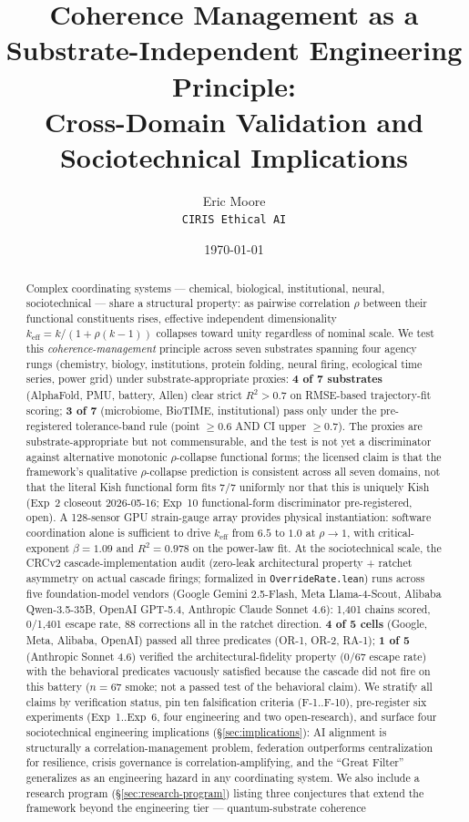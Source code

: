 \documentclass[11pt,a4paper]{article}
\title{Coherence Management as a Substrate-Independent Engineering Principle:\\
\large Cross-Domain Validation and Sociotechnical Implications}
\author{Eric Moore \\ \texttt{CIRIS Ethical AI}}
\date{\today}
\begin{document}
\maketitle

\begin{abstract}
Complex coordinating systems --- chemical, biological, institutional, neural, sociotechnical --- share a structural property: as pairwise correlation $\rho$ between their functional constituents rises, effective independent dimensionality $k_{\text{eff}} = k / (1 + \rho(k-1))$ collapses toward unity regardless of nominal scale. We test this \emph{coherence-management} principle across seven substrates spanning four agency rungs (chemistry, biology, institutions, protein folding, neural firing, ecological time series, power grid) under substrate-appropriate proxies: \textbf{4 of 7 substrates} (AlphaFold, PMU, battery, Allen) clear strict $R^2 > 0.7$ on RMSE-based trajectory-fit scoring; \textbf{3 of 7} (microbiome, BioTIME, institutional) pass only under the pre-registered tolerance-band rule (point $\geq 0.6$ AND CI upper $\geq 0.7$). The proxies are substrate-appropriate but not commensurable, and the test is not yet a discriminator against alternative monotonic $\rho$-collapse functional forms; the licensed claim is that the framework's qualitative $\rho$-collapse prediction is consistent across all seven domains, not that the literal Kish functional form fits 7/7 uniformly nor that this is uniquely Kish (Exp~2 closeout 2026-05-16; Exp~10 functional-form discriminator pre-registered, open). A 128-sensor GPU strain-gauge array provides physical instantiation: software coordination alone is sufficient to drive $k_{\text{eff}}$ from $6.5$ to $1.0$ at $\rho \to 1$, with critical-exponent $\beta = 1.09$ and $R^2 = 0.978$ on the power-law fit. At the sociotechnical scale, the CRCv2 cascade-implementation audit (zero-leak architectural property + ratchet asymmetry on actual cascade firings; formalized in \texttt{OverrideRate.lean}) runs across five foundation-model vendors (Google Gemini 2.5-Flash, Meta Llama-4-Scout, Alibaba Qwen-3.5-35B, OpenAI GPT-5.4, Anthropic Claude Sonnet 4.6): 1,401 chains scored, 0/1,401 escape rate, 88 corrections all in the ratchet direction. \textbf{4 of 5 cells} (Google, Meta, Alibaba, OpenAI) passed all three predicates (OR-1, OR-2, RA-1); \textbf{1 of 5} (Anthropic Sonnet 4.6) verified the architectural-fidelity property (0/67 escape rate) with the behavioral predicates vacuously satisfied because the cascade did not fire on this battery ($n=67$ smoke; not a passed test of the behavioral claim). We stratify all claims by verification status, pin ten falsification criteria (F-1..F-10), pre-register six experiments (Exp~1..Exp~6, four engineering and two open-research), and surface four sociotechnical engineering implications (\S\ref{sec:implications}): AI alignment is structurally a correlation-management problem, federation outperforms centralization for resilience, crisis governance is correlation-amplifying, and the ``Great Filter'' generalizes as an engineering hazard in any coordinating system. We also include a research program (\S\ref{sec:research-program}) listing three conjectures that extend the framework beyond the engineering tier --- quantum-substrate coherence 
\end{abstract}
\end{document}
